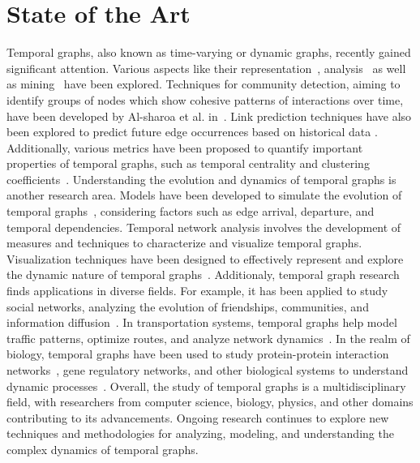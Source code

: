 \section{State of the Art}
\label{ch:prelimiaries:state-of-the-art}
Temporal graphs, also known as time-varying or dynamic graphs, recently gained significant attention.
Various aspects like their representation~\cite{Holme_2012}, analysis~\cite{DBLP:journals/corr/Erlebach0K15}\cite{DBLP:journals/corr/Michail15} as well as mining~\cite{temporal-mining-oettershagen2022tglib} have been explored.
Techniques for community detection, aiming to identify groups of nodes which show cohesive patterns of interactions over time, have been developed by Al-sharoa et al. in~\cite{temporal-comunity-detection-8861143}.
Link prediction techniques have also been explored to predict future edge occurrences based on historical data \cite{temporalLinkPrediction}.
Additionally, various metrics have been proposed to quantify important properties of temporal graphs, such as temporal centrality and clustering coefficients~\cite{temporalClusterCoefficient}.
Understanding the evolution and dynamics of temporal graphs is another research area.
Models have been developed to simulate the evolution of temporal graphs~\cite{temporalEvolution}, considering factors such as edge arrival, departure, and temporal dependencies.
Temporal network analysis involves the development of measures and techniques to characterize and visualize temporal graphs. Visualization techniques have been designed to effectively represent and explore the dynamic nature of temporal graphs~\cite{kerracher2014design}.
Additionaly, temporal graph research finds applications in diverse fields.
For example, it has been applied to study social networks, analyzing the evolution of friendships, communities, and information diffusion~\cite{temporal-friends}\cite{temporal-information-diffusion}.
In transportation systems, temporal graphs help model traffic patterns, optimize routes, and analyze network dynamics~\cite{tang2009temporal}.
In the realm of biology, temporal graphs have been used to study protein-protein interaction networks~\cite{fu2022dppin}, gene regulatory networks, and other biological systems to understand dynamic processes~\cite{dibrita2022temporal}.
Overall, the study of temporal graphs is a multidisciplinary field, with researchers from computer science, biology, physics, and other domains contributing to its advancements.
Ongoing research continues to explore new techniques and methodologies for analyzing, modeling, and understanding the complex dynamics of temporal graphs.

